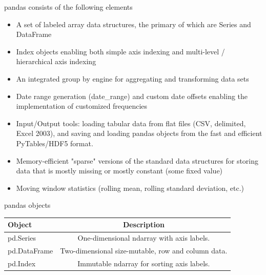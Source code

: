 \documentclass[10pt]{beamer}
\begin{document}
\begin{frame}{pandas consists of the following elements}

\begin{itemize}
\item A set of labeled array data structures, the primary of which are Series and DataFrame
\item Index objects enabling both simple axis indexing and multi-level / hierarchical axis indexing
\item An integrated group by engine for aggregating and transforming data sets
\item Date range generation (date\_range) and custom date offsets enabling the implementation of customized frequencies
\item Input/Output tools: loading tabular data from flat files (CSV, delimited, Excel 2003), and saving and loading pandas objects from the fast and efficient PyTables/HDF5 format.
\item Memory-efficient "sparse" versions of the standard data structures for storing data that is mostly missing or mostly constant (some fixed value)
\item Moving window statistics (rolling mean, rolling standard deviation, etc.)
\end{itemize}
\end{frame}


\begin{frame}[fragile]{pandas objects}
\begin{table}
\begin{tabular}{lc}
\textbf{Object} & \textbf{Description} \\
\hline
pd.Series & One-dimensional ndarray with axis labels. \\
pd.DataFrame & Two-dimensional size-mutable, row and column data. \\
pd.Index & Immutable ndarray for sorting axis labels. 
\end{tabular}
\end{table}
\end{frame}
\end{document}
